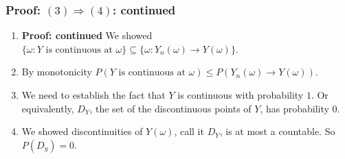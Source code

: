 \documentclass[handout]{beamer}
\begin{document}
\frame
{
  \frametitle{Proof: $(3) \Rightarrow (4)$: continued} 


\begin{enumerate}

\item \textbf{Proof: continued} We showed $\{\omega : Y \text{ is continuous at } \omega\} \subseteq  \{ \omega : Y_n(\omega) \rightarrow Y(\omega)\}$.

\item By monotonicity $P(Y \text{ is continuous at } \omega ) \le  P( Y_n(\omega) \rightarrow Y(\omega) )$.

\item We need to establish the fact that $Y$ is continuous with probability $1$. Or equivalently, $D_Y$, the set of the discontinuous points of $Y$, has probability 0. 


\item We showed discontinuities of $Y(\omega)$, call it $D_Y$, is at most a countable. So $P(D_y) = 0$.

\end{enumerate}
}
\end{document}
